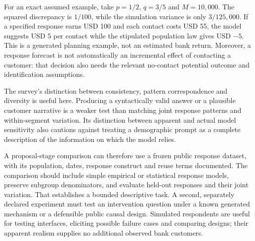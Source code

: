 For an exact assumed example, take $p=1/2$, $q=3/5$ and $M=10{,}000$.
The squared discrepancy is $1/100$, while the simulation variance is only
$3/125{,}000$. If a specified response earns USD 100 and each contact costs
USD 55, the model suggests USD 5 per contact while the stipulated population
law gives USD $-5$. This is a generated planning example, not an estimated
bank return. Moreover, a response forecast is not automatically an incremental
effect of contacting a customer: that decision also needs the relevant
no-contact potential outcome and identification assumptions.
\citep{exec20_population_attribution_reference}

The survey's distinction between consistency, pattern correspondence and
diversity is useful here. Producing a syntactically valid answer or a plausible
customer narrative is a weaker test than matching joint response patterns and
within-segment variation. Its distinction between apparent and actual model
sensitivity also cautions against treating a demographic prompt as a complete
description of the information on which the model relies.
\citep{exec20_population}

A proposal-stage comparison can therefore use a frozen public response
dataset, with its population, dates, response construct and reuse terms
documented. The comparison should include simple empirical or statistical
response models, preserve subgroup denominators, and evaluate held-out
responses and their joint variation. That establishes a bounded descriptive
task. A second, separately declared experiment must test an intervention
question under a known generated mechanism or a defensible public causal
design. Simulated respondents are useful for testing interfaces, eliciting
possible failure cases and comparing designs; their apparent realism supplies
no additional observed bank customers.

